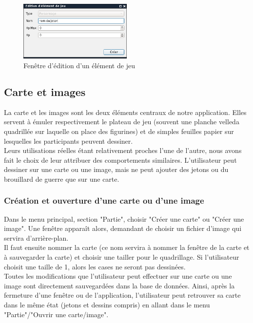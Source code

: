\begin{figure}[h!]
	\centering
	\includegraphics[width=0.5\textwidth]{img/gameobject_edit.png}
	\caption{Fenêtre d'édition d'un élément de jeu}
	\label{fig:gameobject_edit}
\end{figure}
\newpage

\subsection{Carte et images}

La carte et les images sont les deux éléments centraux de notre application. Elles servent à émuler respectivement le plateau de jeu (souvent une planche velleda quadrillée sur laquelle on place des figurines) et de simples feuilles papier sur lesquelles les participants peuvent dessiner.\\
Leurs utilisations réelles étant relativement proches l'une de l'autre, nous avons fait le choix de leur attribuer des comportements similaires. L'utilisateur peut dessiner sur une carte ou une image, mais ne peut ajouter des jetons ou du brouillard de guerre que sur une carte.

\subsubsection{Création et ouverture d'une carte ou d'une image}

Dans le menu principal, section "Partie", choisir "Créer une carte" ou "Créer une image". Une fenêtre apparaît alors, demandant de choisir un fichier d'image qui servira d'arrière-plan. \\
Il faut ensuite nommer la carte (ce nom servira à nommer la fenêtre de la carte et à sauvegarder la carte) et choisir une tailler pour le quadrillage. Si l'utilisateur choisit une taille de 1, alors les cases ne seront pas dessinées.\\

Toutes les modifications que l'utilisateur peut effectuer sur une carte ou une image sont directement sauvegardées dans la base de données. Ainsi, après la fermeture d'une fenêtre ou de l'application, l'utilisateur peut retrouver sa carte dans le même état (jetons et dessins compris) en allant dans le menu "Partie"/"Ouvrir une carte/image".

